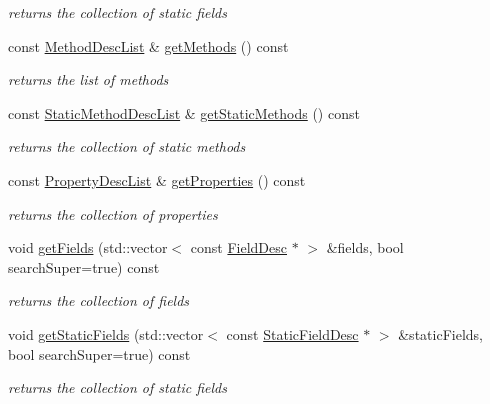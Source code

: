 \begin{DoxyCompactItemize}
\begin{DoxyCompactList}\small\item\em returns the collection of static fields \end{DoxyCompactList}\item 
const \hyperlink{classagm_1_1reflection_1_1_class_desc_aa107068fb197533acdf45241e6935abf}{Method\+Desc\+List} \& \hyperlink{classagm_1_1reflection_1_1_class_desc_ae9761b77c3e9bee540573de06b13ad61}{get\+Methods} () const 
\begin{DoxyCompactList}\small\item\em returns the list of methods \end{DoxyCompactList}\item 
const \hyperlink{classagm_1_1reflection_1_1_class_desc_ae73db259edf46f31948cada96b9067bb}{Static\+Method\+Desc\+List} \& \hyperlink{classagm_1_1reflection_1_1_class_desc_aabed2c87f6a249fbdd31208c0b82afb7}{get\+Static\+Methods} () const 
\begin{DoxyCompactList}\small\item\em returns the collection of static methods \end{DoxyCompactList}\item 
const \hyperlink{classagm_1_1reflection_1_1_class_desc_aed6874712c84179435e26d7180a0c120}{Property\+Desc\+List} \& \hyperlink{classagm_1_1reflection_1_1_class_desc_a65a2f3d5a6422d4b7fc876e182bd83d0}{get\+Properties} () const 
\begin{DoxyCompactList}\small\item\em returns the collection of properties \end{DoxyCompactList}\item 
void \hyperlink{classagm_1_1reflection_1_1_class_desc_acfa333a961e83f82cb21b10d1c105888}{get\+Fields} (std\+::vector$<$ const \hyperlink{classagm_1_1reflection_1_1_field_desc}{Field\+Desc} $\ast$ $>$ \&fields, bool search\+Super=true) const 
\begin{DoxyCompactList}\small\item\em returns the collection of fields \end{DoxyCompactList}\item 
void \hyperlink{classagm_1_1reflection_1_1_class_desc_ab9a47579bd02c6dfe0e367382ce5ea7a}{get\+Static\+Fields} (std\+::vector$<$ const \hyperlink{classagm_1_1reflection_1_1_static_field_desc}{Static\+Field\+Desc} $\ast$ $>$ \&static\+Fields, bool search\+Super=true) const 
\begin{DoxyCompactList}\small\item\em returns the collection of static fields \end{DoxyCompactList}\item 

\end{DoxyCompactItemize}
